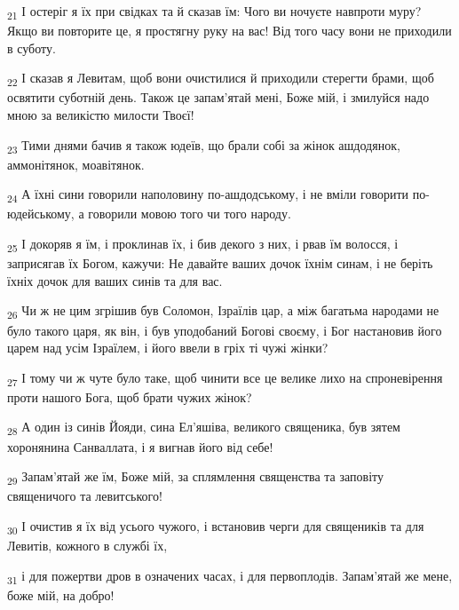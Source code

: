 \begin{tcolorbox}
\textsubscript{21} І остеріг я їх при свідках та й сказав їм: Чого ви ночуєте навпроти муру? Якщо ви повторите це, я простягну руку на вас! Від того часу вони не приходили в суботу.
\end{tcolorbox}
\begin{tcolorbox}
\textsubscript{22} І сказав я Левитам, щоб вони очистилися й приходили стерегти брами, щоб освятити суботній день. Також це запам'ятай мені, Боже мій, і змилуйся надо мною за великістю милости Твоєї!
\end{tcolorbox}
\begin{tcolorbox}
\textsubscript{23} Тими днями бачив я також юдеїв, що брали собі за жінок ашдодянок, аммонітянок, моавітянок.
\end{tcolorbox}
\begin{tcolorbox}
\textsubscript{24} А їхні сини говорили наполовину по-ашдодському, і не вміли говорити по-юдейському, а говорили мовою того чи того народу.
\end{tcolorbox}
\begin{tcolorbox}
\textsubscript{25} І докоряв я їм, і проклинав їх, і бив декого з них, і рвав їм волосся, і заприсягав їх Богом, кажучи: Не давайте ваших дочок їхнім синам, і не беріть їхніх дочок для ваших синів та для вас.
\end{tcolorbox}
\begin{tcolorbox}
\textsubscript{26} Чи ж не цим згрішив був Соломон, Ізраїлів цар, а між багатьма народами не було такого царя, як він, і був уподобаний Богові своєму, і Бог настановив його царем над усім Ізраїлем, і його ввели в гріх ті чужі жінки?
\end{tcolorbox}
\begin{tcolorbox}
\textsubscript{27} І тому чи ж чуте було таке, щоб чинити все це велике лихо на спроневірення проти нашого Бога, щоб брати чужих жінок?
\end{tcolorbox}
\begin{tcolorbox}
\textsubscript{28} А один із синів Йояди, сина Ел'яшіва, великого священика, був зятем хоронянина Санваллата, і я вигнав його від себе!
\end{tcolorbox}
\begin{tcolorbox}
\textsubscript{29} Запам'ятай же їм, Боже мій, за сплямлення священства та заповіту священичого та левитського!
\end{tcolorbox}
\begin{tcolorbox}
\textsubscript{30} І очистив я їх від усього чужого, і встановив черги для священиків та для Левитів, кожного в службі їх,
\end{tcolorbox}
\begin{tcolorbox}
\textsubscript{31} і для пожертви дров в означених часах, і для первоплодів. Запам'ятай же мене, боже мій, на добро!
\end{tcolorbox}
